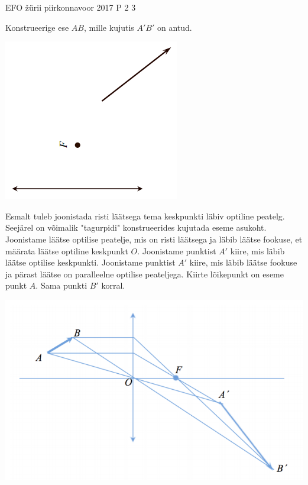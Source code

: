 {EFO žürii} %
{piirkonnavoor} %
{2017} %
{P 2} %
{3} %
{
\ifStatement
Konstrueerige ese $AB$, mille kujutis $A'B'$ on antud. 
\begin{center}
	\includegraphics[width=0.5\linewidth]{2017-v2p-02-yl.PNG}
\end{center}
\fi
\ifHint
Esmalt tuleb joonistada risti läätsega tema keskpunkti läbiv optiline peatelg. Seejärel on võimalik "tagurpidi" konstrueerides kujutada eseme asukoht.
\fi
\ifSolution
Joonistame läätse optilise peatelje, mis on risti läätsega ja läbib läätse fookuse, et määrata läätse optiline keskpunkt $O$. Joonistame punktist $A'$ kiire, mis läbib läätse optilise keskpunkti. Joonistame punktist $A'$ kiire, mis läbib läätse fookuse ja pärast läätse on paralleelne optilise peateljega. Kiirte lõikepunkt on eseme punkt $A$. Sama punkti $B'$ korral.
\begin{center}
	\includegraphics[width=0.5\linewidth]{2017-v2p-02-lah.PNG}
\end{center}
\fi
}

